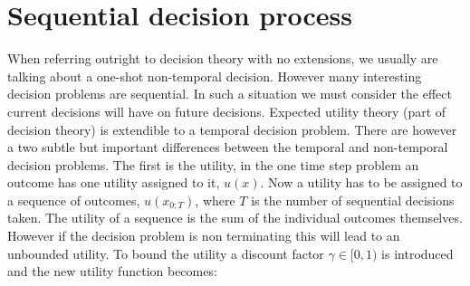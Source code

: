 \section{Sequential decision process}

When referring outright to decision theory with no extensions, we usually are talking about a one-shot
non-temporal decision. However many interesting decision problems are sequential.
In such a situation we must consider the effect current decisions will have on future decisions. Expected utility 
theory (part of decision theory) is extendible to a temporal decision problem. There are however a two subtle but important 
differences between the temporal and non-temporal decision problems. The first is the utility, in the one time step problem 
an outcome has one utility assigned to it, $u(x)$. Now a utility has to be assigned to a sequence of outcomes, $u(x_{0:T})$, 
where $T$ is the number of sequential decisions taken. The utility of a sequence is the sum of the individual outcomes 
themselves. However if the decision problem is non terminating this will lead to an unbounded utility. To bound the utility a 
discount factor $\gamma \in [0,1)$ is introduced and the new utility function becomes:

